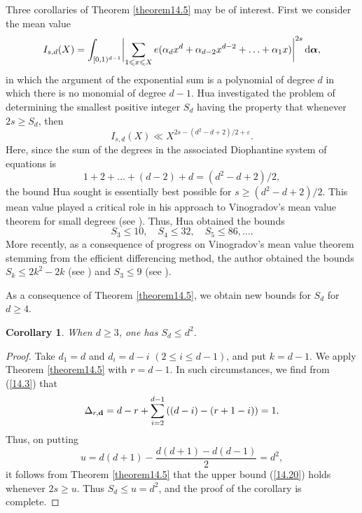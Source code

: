 \documentclass[12pt,reqno]{amsart}
\newtheorem{corollary}[theorem]{Corollary}
\theoremstyle{definition}
\theoremstyle{remark}
\numberwithin{equation}{section}
\def\bfd{{\mathbf d}} \def\bfe{{\mathbf e}} \def\bff{{\mathbf f}}
\def\alp{{\alpha}} \def\bfalp{{\boldsymbol \alpha}}
\def\eps{\varepsilon}
\def\le{\leqslant} \def\ge{\geqslant} \def\pleq{\preccurlyeq} \def\ple{\prec}
\def\d{{\,{\rm d}}}
\begin{document}
Three corollaries of Theorem \ref{theorem14.5} may be of interest. First we consider the 
mean value
$$I_{s,d}(X)=\int_{[0,1)^{d-1}}\biggl| \sum_{1\le x\le X}e(\alp_dx^d+\alp_{d-2}x^{d-2}
+\ldots +\alp_1x)\biggr|^{2s}\d\bfalp ,$$
in which the argument of the exponential sum is a polynomial of degree $d$ in which there 
is no monomial of degree $d-1$. Hua investigated the problem of determining the smallest 
positive integer $S_d$ having the property that whenever $2s\ge S_d$, then
\begin{equation}\label{14.20}
I_{s,d}(X)\ll X^{2s-(d^2-d+2)/2+\eps}.
\end{equation}
Here, since the sum of the degrees in the associated Diophantine system of equations is 
$$1+2+\ldots +(d-2)+d=(d^2-d+2)/2,$$
the bound Hua sought is essentially best possible for $s\ge (d^2-d+2)/2$. This mean value 
played a critical role in his approach to Vinogradov's mean value theorem for small degrees 
(see \cite[Chapter 5]{Hua1965}). Thus, Hua obtained the bounds
$$S_3\le 10,\quad S_4\le 32,\quad S_5\le 86,\ldots .$$
More recently, as a consequence of progress on Vinogradov's mean value theorem 
stemming from the efficient differencing method, the author obtained the bounds 
$S_k\le 2k^2-2k$ (see \cite[Theorem 11.6]{Woo2013}) and $S_3\le 9$ (see 
\cite[Theorem 1.1]{Woo2015d}).

\par As a consequence of Theorem \ref{theorem14.5}, we obtain new bounds for $S_d$ 
for $d\ge 4$.

\begin{corollary}\label{corollary14.6} When $d\ge 3$, one has $S_d\le d^2$.
\end{corollary}

\begin{proof} Take $d_1=d$ and $d_i=d-i$ $(2\le i\le d-1)$, and put $k=d-1$. We apply 
Theorem \ref{theorem14.5} with $r=d-1$. In such circumstances, we find from (\ref{14.3}) 
that
$$\Del_{r,\bfd}=d-r+\sum_{i=2}^{d-1}\left( (d-i)-(r+1-i)\right)=1.$$
Thus, on putting
$$u=d(d+1)-\frac{d(d+1)-d(d-1)}{2}=d^2,$$
it follows from Theorem \ref{theorem14.5} that the upper bound (\ref{14.20}) holds 
whenever $2s\ge u$. Thus $S_d\le u=d^2$, and the proof of the corollary is complete.
\end{proof}
\end{document}
